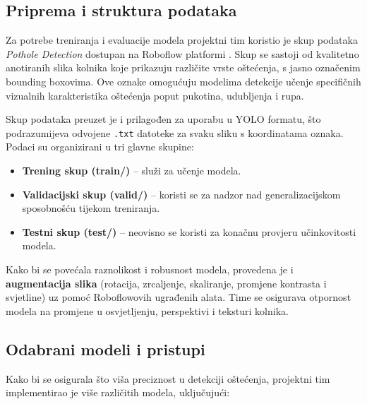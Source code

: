 \documentclass[conference]{IEEEtran}
\begin{document}
\subsection{Priprema i struktura podataka}
\label{sub:priprema_podataka}

Za potrebe treniranja i evaluacije modela projektni tim koristio je skup podataka \textit{Pothole Detection} dostupan na Roboflow platformi \cite{roboflow_pothole}. Skup se sastoji od kvalitetno anotiranih slika kolnika koje prikazuju različite vrste oštećenja, s jasno označenim bounding boxovima. Ove oznake omogućuju modelima detekcije učenje specifičnih vizualnih karakteristika oštećenja poput pukotina, udubljenja i rupa.

Skup podataka preuzet je i prilagođen za uporabu u YOLO formatu, što podrazumijeva odvojene \texttt{.txt} datoteke za svaku sliku s koordinatama oznaka. Podaci su organizirani u tri glavne skupine:

\begin{itemize}
    \item \textbf{Trening skup (train/)} – služi za učenje modela.
    \item \textbf{Validacijski skup (valid/)} – koristi se za nadzor nad generalizacijskom sposobnošću tijekom treniranja.
    \item \textbf{Testni skup (test/)} – neovisno se koristi za konačnu provjeru učinkovitosti modela.
\end{itemize}

Kako bi se povećala raznolikost i robusnost modela, provedena je i \textbf{augmentacija slika} (rotacija, zrcaljenje, skaliranje, promjene kontrasta i svjetline) uz pomoć Roboflowovih ugrađenih alata. Time se osigurava otpornost modela na promjene u osvjetljenju, perspektivi i teksturi kolnika.

\subsection{Odabrani modeli i pristupi}
\label{sub:odabrani_modeli}

Kako bi se osigurala što viša preciznost u detekciji oštećenja, projektni tim implementirao je više različitih modela, uključujući:
\end{document}
